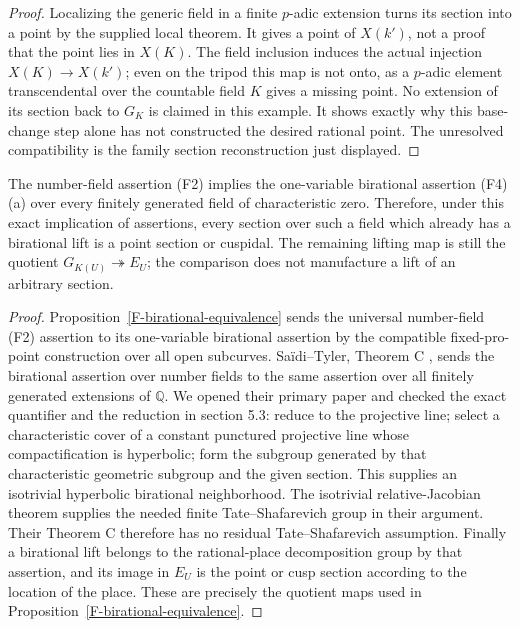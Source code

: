 \begin{proof}
Localizing the generic field in a finite $p$-adic extension
turns its section into a point by the supplied local theorem.
It gives a point of $X(k')$, not a proof that the point lies
in $X(K)$. The field inclusion induces the actual injection
$X(K)\to X(k')$; even on the tripod this map is not onto,
as a $p$-adic element transcendental over the countable field
$K$ gives a missing point. No extension of its section back
to $G_K$ is claimed in this example. It shows exactly why
this base-change step alone has not constructed the desired
rational point. The unresolved compatibility is the family
section reconstruction just displayed.
\end{proof}

\begin{proposition}
\label{F-birational-field-reduction}
The number-field assertion (F2) implies the one-variable
birational assertion (F4)(a) over every finitely generated
field of characteristic zero. Therefore, under this exact
implication of assertions, every section over such a field
which already has a birational lift is a point section or
cuspidal. The remaining lifting map is still the quotient
$G_{K(U)}\twoheadrightarrow E_U$; the comparison does not
manufacture a lift of an arbitrary section.
\end{proposition}
\begin{proof}
Proposition~\ref{F-birational-equivalence} sends the universal
number-field (F2) assertion to its one-variable birational
assertion by the compatible fixed-pro-point construction over
all open subcurves. Sa\"idi--Tyler, Theorem C
\cite{F-SaidiTyler}, sends the birational assertion over number
fields to the same assertion over all finitely generated
extensions of $\mathbb Q$. We opened their primary paper and
checked the exact quantifier and the reduction in section 5.3:
reduce to the projective line; select a characteristic cover of
a constant punctured projective line whose compactification is
hyperbolic; form the subgroup generated by that characteristic
geometric subgroup and the given section. This supplies an
isotrivial hyperbolic birational neighborhood. The isotrivial
relative-Jacobian theorem supplies the needed finite
Tate--Shafarevich group in their argument. Their Theorem C
therefore has no residual Tate--Shafarevich assumption.
Finally a birational lift belongs to the rational-place
decomposition group by that assertion, and its image in
$E_U$ is the point or cusp section according to the location
of the place. These are precisely the quotient maps used in
Proposition~\ref{F-birational-equivalence}.
\end{proof}

